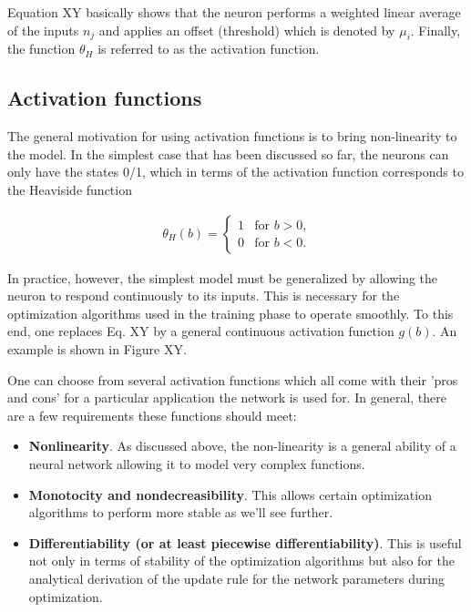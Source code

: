 Equation XY basically shows that the neuron performs a weighted linear average of the inputs $ n_j $ and applies an offset (threshold) which is denoted by $ \mu_i $. Finally, the function $ \theta_H $ is referred to as the activation function.

\subsection{Activation functions}

The general motivation for using activation functions is to bring non-linearity to the model. In the simplest case that has been discussed so far, the neurons can only have the states 0/1, which in terms of the activation function corresponds to the Heaviside function

\begin{gather}
	\theta_H(b) = 
	\begin{cases}	
	1 & \text{for $b > 0$,}\\
	0 & \text{for $b < 0$.}
	\end{cases} 
\end{gather}

In practice, however, the simplest model must be generalized by allowing the neuron to respond continuously to its inputs. This is necessary for the optimization algorithms used in the training phase to operate smoothly. To this end, one replaces Eq. XY by a general continuous activation function $ g(b) $. An example is shown in Figure XY.

One can choose from several activation functions which all come with their 'pros and cons' for a particular application the network is used for. In general, there are a few requirements these functions should meet:

\begin{itemize}
	
\item \textbf{Nonlinearity}. As discussed above, the non-linearity is a general ability of a neural network allowing it to model very complex functions.
\item \textbf{Monotocity and nondecreasibility}. This allows certain optimization algorithms to perform more stable as we'll see further.
\item \textbf{Differentiability (or at least piecewise differentiability)}. This is useful not only in terms of stability of the optimization algorithms but also for the analytical derivation of the update rule for the network parameters during optimization. 
		
\end{itemize}

